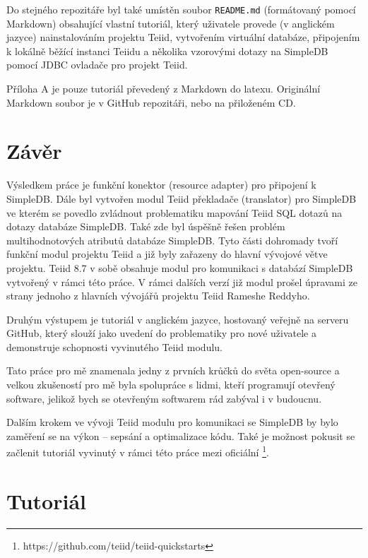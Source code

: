 \documentclass[oneside,12pt]{fithesis2}
\begin{document}
Do stejného repozitáře byl také umístěn soubor \texttt{README.md} (formátovaný pomocí Markdown) obsahující vlastní tutoriál, který uživatele provede (v anglickém jazyce) nainstalováním projektu Teiid, vytvořením virtuální databáze, připojením k lokálně běžící instanci Teiidu a několika vzorovými dotazy na SimpleDB pomocí JDBC ovladače pro projekt Teiid.

Příloha A je pouze tutoriál převedený z Markdown do latexu. Originální Markdown soubor je v GitHub repozitáři, nebo na přiloženém CD.
\chapter{Závěr}
Výsledkem práce je funkční konektor (resource adapter) pro připojení k SimpleDB. Dále byl vytvořen modul Teiid překladače (translator) pro SimpleDB ve kterém se povedlo zvládnout problematiku mapování Teiid SQL dotazů na dotazy databáze SimpleDB. Také zde byl úspěšně řešen problém multihodnotových atributů databáze SimpleDB. Tyto části dohromady tvoří funkční modul projektu Teiid a již byly zařazeny do hlavní vývojové větve projektu. Teiid 8.7 v sobě obsahuje modul pro komunikaci s databází SimpleDB vytvořený v rámci této práce. V rámci dalších verzí již modul prošel úpravami ze strany jednoho z hlavních vývojářů projektu Teiid Rameshe Reddyho.

Druhým výstupem je tutoriál v anglickém jazyce, hostovaný veřejně na serveru GitHub, který slouží jako uvedení do problematiky pro nové uživatele a demonstruje schopnosti vyvinutého Teiid modulu.

Tato práce pro mě znamenala jedny z prvních krůčků do světa open-source a velkou zkušeností pro mě byla spolupráce s lidmi, kteří programují otevřený software, jelikož bych se otevřeným softwarem rád zabýval i v budoucnu.

Dalším krokem ve vývoji Teiid modulu pro komunikaci se SimpleDB by bylo zaměření se na výkon -- sepsání  a optimalizace kódu. Také je možnost pokusit se začlenit tutoriál vyvinutý v rámci této práce mezi oficiální \footnote{https://github.com/teiid/teiid-quickstarts}.
\nocite{*}

\appendix
\chapter{Tutoriál}
\label{tutorial}
\end{document}
